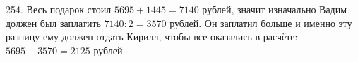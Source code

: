 254. Весь подарок стоил $5695+1445=7140$ рублей, значит изначально Вадим должен был заплатить $7140:2=3570$ рублей. Он заплатил больше и именно эту разницу ему должен отдать Кирилл, чтобы все оказались в расчёте: $5695-3570=2125$ рублей.\\

